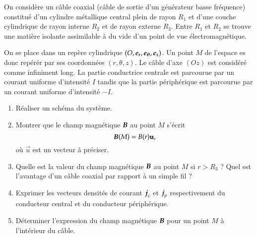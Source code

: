 \begin{exocor}
	On considère un câble coaxial (câble de sortie d'un générateur basse fréquence)
	constitué d'un cylindre métallique central plein de rayon $R_1$ et d'une 
	couche cylindrique de rayon interne $R_2$ et de rayon externe $R_3$. 
	Entre $R_1$ et $R_2$ se trouve une matière isolante assimilable à du vide d'un 
	point de vue électromagnétique. 
	
	On se place dans un repère cylindrique 
	$(O, \er, \etheta, \ez)$. Un point $M$ de l'espace es donc repérér par 
	ses coordonnées $(r, \theta, z)$. Le câble d'axe $(Oz)$ est considéré
	comme infiniment long. La partie conductrice centrale est parcourue 
	par un courant uniforme d'intensité $I$ tandis que la partie périphérique
	est parcourue par un courant uniforme d'intensité $-I$.

	\begin{enumerate}
		\item Réaliser un schéma du système.
		\item Montrer que le champ magnétique $\vecb$ au point $M$ s'écrit
		\begin{equation*}
			\vecb(M) = B(r) \vec{u},
		\end{equation*}
		où $\vec{u}$ est un vecteur à préciser.
		\item Quelle est la valeur du champ magnétique $\vecb$ au point $M$
		  si $r > R_3$ ? Quel est l'avantage d'un câble coaxial par rapport
		  à un simple fil ?
		\item Exprimer les vecteurs densités de courant $\vecj_c$ et 
		  $\vecj_p$ respectivement du conducteur central et du conducteur 
		  périphérique.
		\item Déterminer l'expression du champ magnétique $\vecb$ pour
		  un point $M$ à l'intérieur du câble.
	\end{enumerate}
\end{exocor}
\newpage

